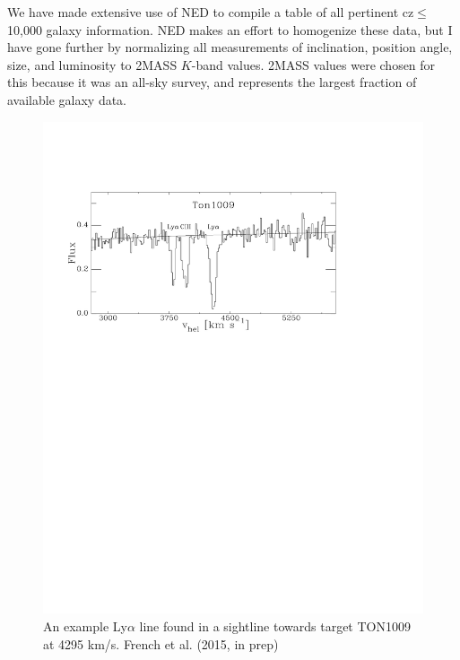 \documentclass[iop]{emulateapj-rtx4}
\begin{document}
We have made extensive use of NED to compile a table of all pertinent cz$\leq$10,000 galaxy information. NED makes an effort to homogenize these data, but I have gone further by normalizing all measurements of inclination, position angle, size, and luminosity to 2MASS $K$-band values. 2MASS values were chosen for this because it was an all-sky survey, and represents the largest fraction of available galaxy data.
\begin{figure}[h!]
\centering
  \includegraphics[width=1.\linewidth]{figTON1009_crop.pdf}
  \caption{An example Ly$\alpha$ line found in a sightline towards target TON1009 at 4295 km/s. French et al. (2015, in prep)}
  \label{line}
\end{figure}
\end{document}
